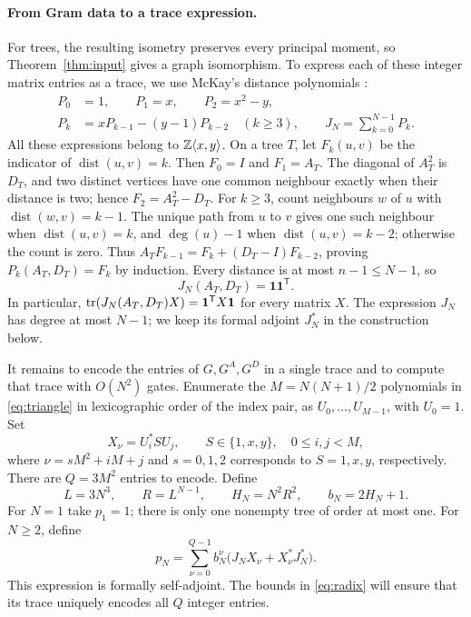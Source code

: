 \documentclass[11pt,letterpaper]{article}
\theoremstyle{definition}\newtheorem{definition}[theorem]{Definition}
\theoremstyle{remark}\newtheorem{remark}[theorem]{Remark}
\newcommand{\one}{\mathbf1}\newcommand{\M}{\mathcal M}
\begin{document}
\paragraph{From Gram data to a trace expression.}
For trees, the resulting isometry preserves every principal moment, so
Theorem~\ref{thm:input} gives a graph isomorphism. To express each of these
integer matrix entries as a trace, we use McKay's distance polynomials
\cite[Lemma 5.1 and Corollary 5.2]{McKay}:
\begin{equation}\label{eq:distance}
\begin{aligned}
P_0&=1,\qquad P_1=x,\qquad P_2=x^2-y,\\
P_k&=xP_{k-1}-(y-1)P_{k-2}\quad(k\ge3),\qquad
J_N=\sum_{k=0}^{N-1}P_k.
\end{aligned}
\end{equation}
All these expressions belong to $\mathbb Z\langle x,y\rangle$.
On a tree $T$, let $F_k(u,v)$ be the indicator of $\operatorname{dist}(u,v)=k$.
Then $F_0=I$ and $F_1=A_T$. The diagonal of $A_T^2$ is $D_T$, and two distinct
vertices have one common neighbour exactly when their distance is two; hence
$F_2=A_T^2-D_T$. For $k\ge3$, count neighbours $w$ of $u$ with
$\operatorname{dist}(w,v)=k-1$. The unique path from $u$ to $v$ gives one such
neighbour when $\operatorname{dist}(u,v)=k$, and $\deg(u)-1$ when
$\operatorname{dist}(u,v)=k-2$; otherwise the count is zero. Thus
$A_TF_{k-1}=F_k+(D_T-I)F_{k-2}$, proving $P_k(A_T,D_T)=F_k$ by induction.
Every distance is at most $n-1\le N-1$, so
\begin{equation}\label{eq:J}
J_N(A_T,D_T)=\one\one^{\mathsf T}.
\end{equation}
In particular, $\tr(J_N(A_T,D_T)X)=\one^{\mathsf T}X\one$ for every matrix $X$.
The expression $J_N$ has degree at most $N-1$; we keep its formal adjoint
$J_N^*$ in the construction below.

It remains to encode the entries of $G,G^A,G^D$ in a single trace and to compute
that trace with $O(N^2)$ gates. Enumerate the $M=N(N+1)/2$ polynomials
in \eqref{eq:triangle} in lexicographic order of the index pair, as
$U_0,\ldots,U_{M-1}$, with $U_0=1$. Set
\[
X_\nu=U_i^*SU_j,\qquad S\in\{1,x,y\},\quad 0\le i,j<M,
\]
where $\nu=sM^2+iM+j$ and $s=0,1,2$ corresponds to $S=1,x,y$, respectively.
There are $Q=3M^2$ entries to encode. Define
\begin{equation}\label{eq:radix}
L=3N^3,\qquad R=L^{N-1},\qquad H_N=N^2R^2,\qquad b_N=2H_N+1.
\end{equation}
For $N=1$ take $p_1=1$; there is only one nonempty tree of order at most one.
For $N\ge2$, define
\begin{equation}\label{eq:final}
p_N=\sum_{\nu=0}^{Q-1}b_N^\nu
             \bigl(J_NX_\nu+X_\nu^*J_N^*\bigr).
\end{equation}
This expression is formally self-adjoint. The bounds in \eqref{eq:radix} will
ensure that its trace uniquely encodes all $Q$ integer entries.
\end{document}
